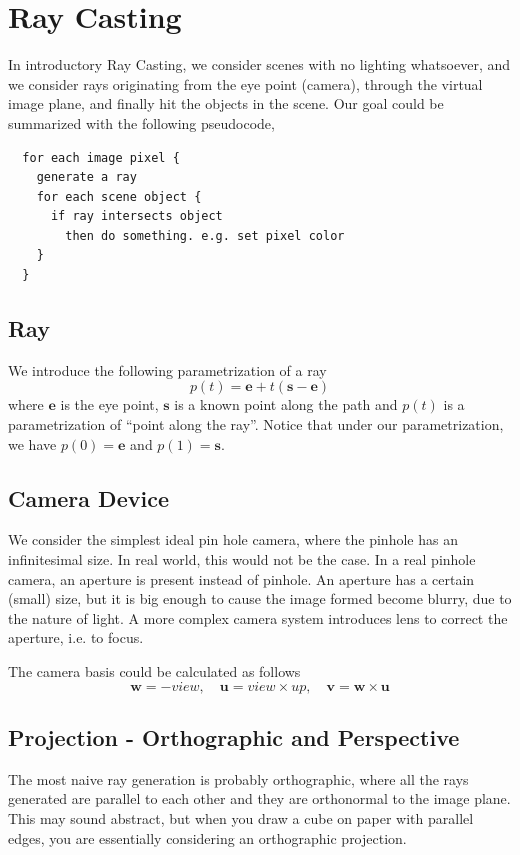 \documentclass[11pt]{article}
\newcommand{\be}{\mathbf{e}}
\newcommand{\bs}{\mathbf{s}}
\newcommand{\bu}{\mathbf{u}}
\newcommand{\bv}{\mathbf{v}}
\newcommand{\bw}{\mathbf{w}}
\begin{document}
\section{Ray Casting} 
In introductory Ray Casting, we consider scenes with no lighting whatsoever, and we consider rays originating from the eye point (camera), through the virtual image plane, and finally hit the objects in the scene. Our goal could be summarized with the following pseudocode, 
\begin{verbatim}
  for each image pixel {
    generate a ray
    for each scene object { 
      if ray intersects object
        then do something. e.g. set pixel color
    }
  }
\end{verbatim}

\subsection{Ray}
We introduce the following parametrization of a ray
\begin{equation}
	p(t) = \be + t(\bs - \be)
\end{equation}
where $\be$ is the eye point, $\bs$ is a known point along the path and $p(t)$ is a parametrization of ``point along the ray''. Notice that under our parametrization, we have $p(0) = \be$ and $p(1) = \bs$. 

\subsection{Camera Device}
We consider the simplest ideal pin hole camera, where the pinhole has an infinitesimal size. In real world, this would not be the case. In a real pinhole camera, an aperture is present instead of pinhole. An aperture has a certain (small) size, but it is big enough to cause the image formed become blurry, due to the nature of light. A more complex camera system introduces lens to correct the aperture, i.e. to focus. 

The camera basis could be calculated as follows
\begin{equation}
	\bw = -view, \quad 
	\bu = view \times up, \quad
	\bv = \bw \times \bu
\end{equation}

\subsection{Projection - Orthographic and Perspective}
The most naive ray generation is probably orthographic, where all the rays generated are parallel to each other and they are orthonormal to the image plane. This may sound abstract, but when you draw a cube on paper with parallel edges, you are essentially considering an orthographic projection. 
\end{document}
